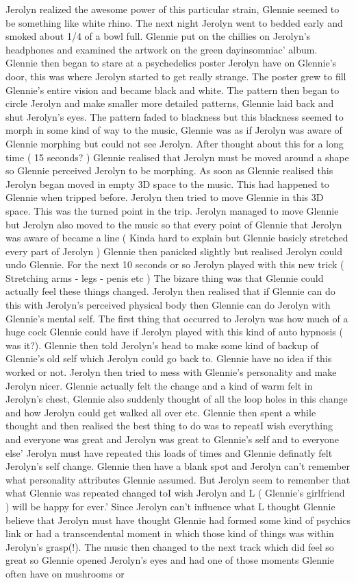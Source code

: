 \documentclass[12pt]{book}
\begin{document}
Jerolyn realized the awesome power of this particular strain, Glennie seemed to be something like white rhino. The next night Jerolyn went to bedded early and smoked about 1/4 of a bowl full. Glennie put on the chillies on Jerolyn's headphones and examined the artwork on the green dayinsomniac' album. Glennie then began to stare at a psychedelics poster Jerolyn have on Glennie's door, this was where Jerolyn started to get really strange. The poster grew to fill Glennie's entire vision and became black and white. The pattern then began to circle Jerolyn and make smaller more detailed patterns, Glennie laid back and shut Jerolyn's eyes. The pattern faded to blackness but this blackness seemed to morph in some kind of way to the music, Glennie was as if Jerolyn was aware of Glennie morphing but could not see Jerolyn. After thought about this for a long time ( 15 seconds? ) Glennie realised that Jerolyn must be moved around a shape so Glennie perceived Jerolyn to be morphing. As soon as Glennie realised this Jerolyn began moved in empty 3D space to the music. This had happened to Glennie when tripped before. Jerolyn then tried to move Glennie in this 3D space. This was the turned point in the trip. Jerolyn managed to move Glennie but Jerolyn also moved to the music so that every point of Glennie that Jerolyn was aware of became a line ( Kinda hard to explain but Glennie basicly stretched every part of Jerolyn ) Glennie then panicked slightly but realised Jerolyn could undo Glennie. For the next 10 seconds or so Jerolyn played with this new trick ( Stretching arms - legs - penis etc ) The bizare thing was that Glennie could actually feel these things changed. Jerolyn then realised that if Glennie can do this with Jerolyn's perceived physical body then Glennie can do Jerolyn with Glennie's mental self. The first thing that occurred to Jerolyn was how much of a huge cock Glennie could have if Jerolyn played with this kind of auto hypnosis ( was it?). Glennie then told Jerolyn's head to make some kind of backup of Glennie's old self which Jerolyn could go back to. Glennie have no idea if this worked or not. Jerolyn then tried to mess with Glennie's personality and make Jerolyn nicer. Glennie actually felt the change and a kind of warm felt in Jerolyn's chest, Glennie also suddenly thought of all the loop holes in this change and how Jerolyn could get walked all over etc. Glennie then spent a while thought and then realised the best thing to do was to repeatI wish everything and everyone was great and Jerolyn was great to Glennie's self and to everyone else' Jerolyn must have repeated this loads of times and Glennie definatly felt Jerolyn's self change. Glennie then have a blank spot and Jerolyn can't remember what personality attributes Glennie assumed. But Jerolyn seem to remember that what Glennie was repeated changed toI wish Jerolyn and L ( Glennie's girlfriend ) will be happy for ever.' Since Jerolyn can't influence what L thought Glennie believe that Jerolyn must have thought Glennie had formed some kind of psychics link or had a transcendental moment in which those kind of things was within Jerolyn's grasp(!). The music then changed to the next track which did feel so great so Glennie opened Jerolyn's eyes and had one of those moments Glennie often have on mushrooms or 
\end{document}
